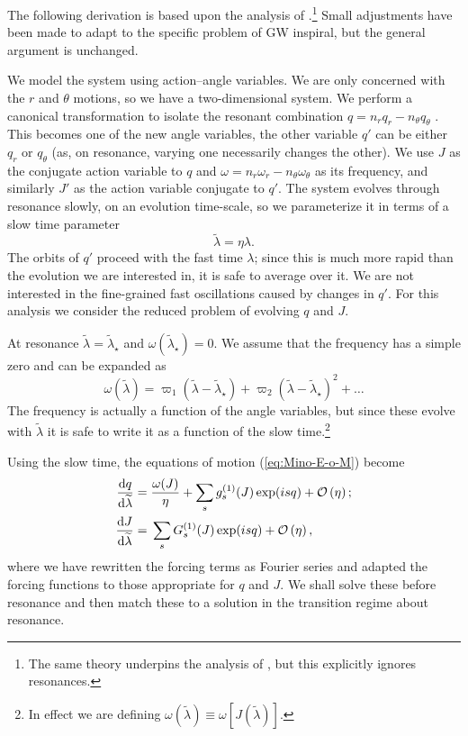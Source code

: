 The following derivation is based upon the analysis of \citet{Kevorkian1987}.\footnote{The same theory underpins the analysis of \citet{Hinderer2008}, but this explicitly ignores resonances.} Small adjustments have been made to adapt to the specific problem of GW inspiral, but the general argument is unchanged.

We model the system using action--angle variables. We are only concerned with the $r$ and $\theta$ motions, so we have a two-dimensional system. We perform a canonical transformation  to isolate the resonant combination $q = n_r q_r - n_\theta q_\theta$ \citep{Bosley1992}. This becomes one of the new angle variables, the other variable $q'$ can be either $q_r$ or $q_\theta$ (as, on resonance, varying one necessarily changes the other). We use $J$ as the conjugate action variable to $q$ and $\omega = n_r \omega_r - n_\theta \omega_\theta$ as its frequency, and similarly $J'$ as the action variable conjugate to $q'$. The system evolves through resonance slowly, on an evolution time-scale, so we parameterize it in terms of a slow time parameter
\begin{equation}
\widetilde{\lambda} = \eta\lambda.
\end{equation}
The orbits of $q'$ proceed with the fast time $\lambda$; since this is much more rapid than the evolution we are interested in, it is safe to average over it. We are not interested in the fine-grained fast oscillations caused by changes in $q'$. For this analysis we consider the reduced problem of evolving $q$ and $J$.

At resonance $\widetilde{\lambda} = \widetilde{\lambda}_\star$ and $\omega(\widetilde{\lambda}_\star) = 0$. We assume that the frequency has a simple zero and can be expanded as
\begin{equation}
\omega\left(\widetilde{\lambda}\right) = \varpi_1\left(\widetilde{\lambda} - \widetilde{\lambda}_\star\right) + \varpi_2\left(\widetilde{\lambda} - \widetilde{\lambda}_\star\right)^2 + \ldots
\label{eq:omega-series}
\end{equation}
The frequency is actually a function of the angle variables, but since these evolve with $\widetilde{\lambda}$ it is safe to write it as a function of the slow time.\footnote{In effect we are defining $\omega(\widetilde{\lambda}) \equiv \omega[J(\widetilde{\lambda})]$.}

Using the slow time, the equations of motion (\ref{eq:Mino-E-o-M}) become
\begin{subequations}
\begin{align}
\dfrac{\mathrm{d} {q}}{\mathrm{d} {\widetilde{\lambda}}} = {} & \dfrac{\omega(J)}{\eta} + \sum_s g_s^{(1)}(J)\exp(is q)  + \mathcal{O}\left({\eta}\right); \\
\dfrac{\mathrm{d} {J}}{\mathrm{d} {\widetilde{\lambda}}} = {} & \sum_s G_s^{(1)}(J)\exp(is q) + \mathcal{O}\left({\eta}\right),
\end{align}
\end{subequations}
where we have rewritten the forcing terms as Fourier series and adapted the forcing functions to those appropriate for $q$ and $J$. We shall solve these before resonance and then match these to a solution in the transition regime about resonance.

